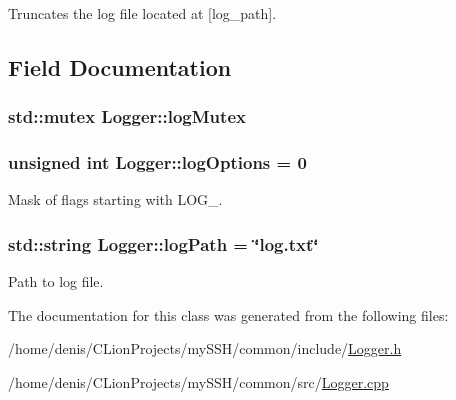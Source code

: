 Truncates the log file located at \mbox{[}log\+\_\+path\mbox{]}. 



\subsection{Field Documentation}
\subsubsection[{\texorpdfstring{log\+Mutex}{logMutex}}]{\setlength{\rightskip}{0pt plus 5cm}std\+::mutex Logger\+::log\+Mutex\hspace{0.3cm}{\ttfamily [static]}}\hypertarget{classLogger_a1a7f5dc4185f8bff7778f1d6aa8525a9}{}\label{classLogger_a1a7f5dc4185f8bff7778f1d6aa8525a9}
\subsubsection[{\texorpdfstring{log\+Options}{logOptions}}]{\setlength{\rightskip}{0pt plus 5cm}unsigned int Logger\+::log\+Options = 0\hspace{0.3cm}{\ttfamily [static]}}\hypertarget{classLogger_a60d0eaf4eece8b505c52c6302048a9c1}{}\label{classLogger_a60d0eaf4eece8b505c52c6302048a9c1}


Mask of flags starting with L\+O\+G\+\_\+. 

\subsubsection[{\texorpdfstring{log\+Path}{logPath}}]{\setlength{\rightskip}{0pt plus 5cm}std\+::string Logger\+::log\+Path = \char`\"{}log.\+txt\char`\"{}\hspace{0.3cm}{\ttfamily [static]}}\hypertarget{classLogger_af2d3e37c3764663b3e103f0fc2003cb6}{}\label{classLogger_af2d3e37c3764663b3e103f0fc2003cb6}


Path to log file. 



The documentation for this class was generated from the following files\+:\begin{DoxyCompactItemize}
\item 
/home/denis/\+C\+Lion\+Projects/my\+S\+S\+H/common/include/\hyperlink{Logger_8h}{Logger.\+h}\item 
/home/denis/\+C\+Lion\+Projects/my\+S\+S\+H/common/src/\hyperlink{Logger_8cpp}{Logger.\+cpp}\end{DoxyCompactItemize}
